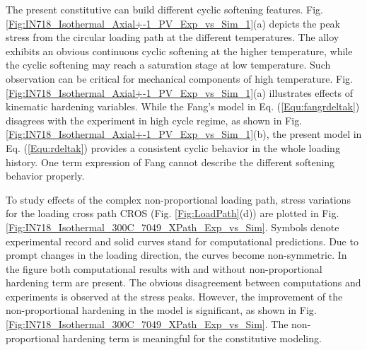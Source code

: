 \documentclass[preprint,5p,twocolumn,11pt,sort&compress]{elsarticle}
\begin{document}
The present constitutive can build different cyclic softening features. Fig. \ref{Fig:IN718_Isothermal_Axial+-1_PV_Exp_vs_Sim_1}(a) depicts the peak stress from the circular loading path at the different temperatures.
The alloy exhibits an obvious continuous cyclic softening at the higher temperature, while the cyclic softening may reach a saturation stage at low temperature. Such observation can be critical for mechanical components of high temperature.
Fig. \ref{Fig:IN718_Isothermal_Axial+-1_PV_Exp_vs_Sim_1}(a) illustrates effects of kinematic hardening variables. While the Fang's model  \cite{fang2015cyclic}  in Eq. (\ref{Equ:fangrdeltak}) disagrees with the experiment in high cycle regime, as shown in Fig. \ref{Fig:IN718_Isothermal_Axial+-1_PV_Exp_vs_Sim_1}(b), the present model in Eq. (\ref{Equ:rdeltak}) provides a consistent cyclic behavior in the whole loading history. One term expression of Fang cannot describe the different softening behavior properly.

\begin{figure*}[!htp]
\caption{Peak stress variations for the circular loading path CIRC at 300$^{\circ}$C, 550$^{\circ}$C and 650$^{\circ}$C, respectively. (a) The present model. (b) Prediction based on Eq. (\ref{Equ:fangrdeltak})  \cite{fang2015cyclic} .}
\label{Fig:IN718_Isothermal_Axial+-1_PV_Exp_vs_Sim_1}
\end{figure*}

To study effects of the complex non-proportional loading path, stress variations for the loading cross path CROS (Fig. \ref{Fig:LoadPath}(d)) are plotted in Fig. \ref{Fig:IN718_Isothermal_300C_7049_XPath_Exp_vs_Sim}. Symbols denote experimental record and solid curves stand for computational predictions. Due to prompt changes in the loading direction, the curves become non-symmetric. In the figure both computational results with and without non-proportional hardening term are present. The obvious disagreement between computations and experiments is observed at the stress peaks. However, the improvement of the non-proportional hardening in the model is significant, as shown in Fig. \ref{Fig:IN718_Isothermal_300C_7049_XPath_Exp_vs_Sim}. The non-proportional hardening term is meaningful for the constitutive modeling.
\end{document}
